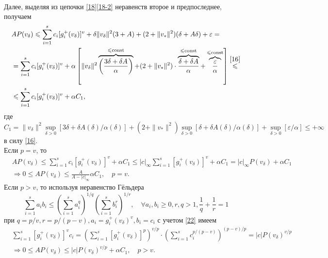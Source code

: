 Далее, выделяя из цепочки \eqref{18}\eqref{18-2} неравенств второе и предпоследнее, получаем
\begin{equation}
\label{22}
\begin{aligned}
&AP(v_{\delta})\leqslant\sum_{i=1}^{s}c_i[g_i^+(v_{\delta})]^v+\delta\|v_{\delta}\|^2(3+A)+(2+\|v_*\|^2)(\delta+A\delta)+\varepsilon=\\
&=\sum_{i=1}^{s}c_i[g_i^+(v_{\delta})]^v+\alpha\left[\|v_{\delta}\|^2\overbrace{\left(\frac{3\delta+\delta A}{\alpha} \right)}^{\leqslant \text{const}}+(2+\|v_*\|^2)\cdot \overbrace{\frac{\delta+\delta A}{\alpha}}^{\leqslant\text{const}}+\overbrace{\frac{\varepsilon}{\alpha}}^{\leqslant\text{const}} \right]\stackrel{\eqref{16}}{\leqslant}\\
&\leqslant \sum_{i=1}^{s}c_i[g_i^+(v_{\delta})]^v+\alpha C_1,
\end{aligned}
\end{equation}
где $C_1=\|v_{\delta}\|^2\sup\limits_{\delta>0}[3\delta+\delta A(\delta)/\alpha(\delta)]+(2+\|v_*\|^2)\sup\limits_{\delta>0}[\delta+\delta A(\delta)/\alpha(\delta)]+\sup\limits_{\delta>0}[\varepsilon/\alpha]\leqslant+\infty$ в силу \eqref{16}.\\
Если $p=v$, то 
\begin{equation}
\label{23}
\begin{aligned}
&AP(v_{\delta})\leqslant\sum_{i=1}^{s}c_i[g_i^+(v_{\delta})]^v+\alpha C_1\leqslant|c|_{\infty}\sum_{i=1}^{s}[g_i^+(v_{\delta})]^v+\alpha C_1=|c|_{\infty}P(v_\delta)+\alpha C_1\\
&\Rightarrow 0\leqslant AP(v_{\delta})\leqslant \frac{A}{A-|c|_{\infty}}\alpha C_1,\quad p=v.
\end{aligned}
\end{equation}
Если $p>v$, то используя неравенство Гёльдера
\begin{equation}
\sum_{i=1}^{s}a_ib_i\leqslant\left(\sum_{i=1}^{s}a_i^q \right)^{1/q}\left(\sum_{i=1}^{s}b_i^r \right)^{1/r},\quad \forall a_i,b_i\geqslant 0,r,q>1,\frac{1}{q}+\frac{1}{r}=1
\end{equation} 
при $q=p/v,r=p/(p-v),a_i=g_i^+(v_{\delta})^v,b_i=c_i$ с учетом \eqref{22} имеем
\begin{equation}
\begin{aligned}
&\sum_{i=1}^{s}[g_i^+(v_{\delta})]^v c_i=\left(\sum_{i=1}^{s}[g_i^+(v_{\delta})]^p \right)^{v/p}\cdot\left(\sum_{i=1}^{s}c_i^{p/(p-v)} \right)^{(p-v)/p}=|c|P(v_{\delta})^{v/p}\\
&\Rightarrow 0\leqslant AP(v_{\delta})\leqslant |c|P(v_{\delta})^{v/p}+\alpha C_1,\quad p>v.
\end{aligned}
\end{equation}
